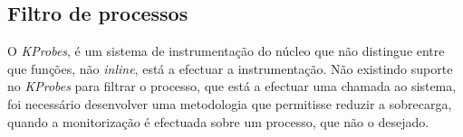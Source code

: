 \subsection{Filtro de processos}







O \textit{KProbes}, é um sistema de instrumentação do núcleo que não distingue entre que funções, não \textit{inline}, está a efectuar a instrumentação.
Não existindo suporte no \textit{KProbes} para filtrar o processo, que está a efectuar uma chamada ao sistema, foi necessário desenvolver uma metodologia que permitisse reduzir a sobrecarga, quando a monitorização é efectuada sobre um processo, que não o desejado.




